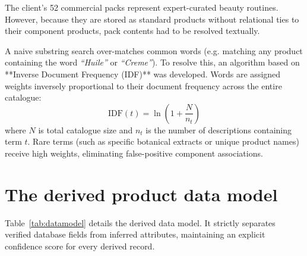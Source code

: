 The client's 52 commercial packs represent expert-curated beauty routines. However, because they are stored as standard products without relational ties to their component products, pack contents had to be resolved textually.

A naive substring search over-matches common words (e.g. matching any product containing the word \emph{``Huile''} or \emph{``Creme''}). To resolve this, an algorithm based on **Inverse Document Frequency (IDF)** \cite{sparckjones1972, robertson2004} was developed. Words are assigned weights inversely proportional to their document frequency across the entire catalogue:
\begin{equation}
  \text{IDF}(t) = \ln \left( 1 + \frac{N}{n_t} \right)
\end{equation}
where $N$ is total catalogue size and $n_t$ is the number of descriptions containing term $t$. Rare terms (such as specific botanical extracts or unique product names) receive high weights, eliminating false-positive component associations.

\section{The derived product data model}

Table~\ref{tab:datamodel} details the derived data model. It strictly separates verified database fields from inferred attributes, maintaining an explicit confidence score for every derived record.

